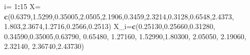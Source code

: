 \documentclass[
  a4paper,
  oneside,
  openany]{book}
\newenvironment{Shaded}{\begin{snugshade}}{\end{snugshade}}
\newcommand{\DecValTok}[1]{\textcolor[rgb]{0.00,0.00,0.81}{#1}}
\newcommand{\FloatTok}[1]{\textcolor[rgb]{0.00,0.00,0.81}{#1}}
\newcommand{\FunctionTok}[1]{\textcolor[rgb]{0.13,0.29,0.53}{\textbf{#1}}}
\newcommand{\NormalTok}[1]{#1}
\newcommand{\OtherTok}[1]{\textcolor[rgb]{0.56,0.35,0.01}{#1}}
\newcommand{\SpecialCharTok}[1]{\textcolor[rgb]{0.81,0.36,0.00}{\textbf{#1}}}
\begin{document}
\begin{Shaded}
\begin{Highlighting}[]
\NormalTok{i}\OtherTok{=} \DecValTok{1}\SpecialCharTok{:}\DecValTok{15}
\NormalTok{X}\OtherTok{=} \FunctionTok{c}\NormalTok{(}\FloatTok{0.6379}\NormalTok{,}\FloatTok{1.5299}\NormalTok{,}\FloatTok{0.35005}\NormalTok{,}\FloatTok{2.0505}\NormalTok{,}\FloatTok{2.1906}\NormalTok{,}\FloatTok{0.3459}\NormalTok{,}\FloatTok{2.3214}\NormalTok{,}\FloatTok{0.3128}\NormalTok{,}\FloatTok{0.6548}\NormalTok{,}\FloatTok{2.4373}\NormalTok{,}
               \FloatTok{1.803}\NormalTok{,}\FloatTok{2.3674}\NormalTok{,}\FloatTok{1.2716}\NormalTok{,}\FloatTok{0.2566}\NormalTok{,}\FloatTok{0.2513}\NormalTok{)}
\NormalTok{X\_i}\OtherTok{=}\FunctionTok{c}\NormalTok{(}\FloatTok{0.25130}\NormalTok{,}\FloatTok{0.25660}\NormalTok{,}\FloatTok{0.31280}\NormalTok{, }\FloatTok{0.34590}\NormalTok{,}\FloatTok{0.35005}\NormalTok{,}\FloatTok{0.63790}\NormalTok{, }\FloatTok{0.65480}\NormalTok{, }\FloatTok{1.27160}\NormalTok{, }
               \FloatTok{1.52990}\NormalTok{,}\FloatTok{1.80300}\NormalTok{, }\FloatTok{2.05050}\NormalTok{, }\FloatTok{2.19060}\NormalTok{, }\FloatTok{2.32140}\NormalTok{, }\FloatTok{2.36740}\NormalTok{,}\FloatTok{2.43730}\NormalTok{)}


\end{Highlighting}
\end{Shaded}
\end{document}
